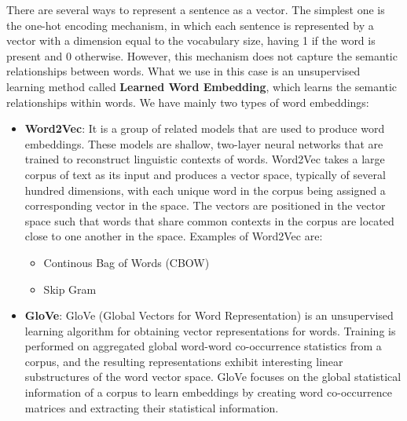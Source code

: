 \documentclass[12pt]{article}
\begin{document}
There are several ways to represent a sentence as a vector. The simplest one is the one-hot encoding mechanism, 
in which each sentence is represented by a vector with a dimension equal to the vocabulary size, having 1 
if the word is present and 0 otherwise. However, this mechanism does not capture the semantic relationships
between words. What we use in this case is an unsupervised learning method called 
\textbf{Learned Word Embedding}, which learns the semantic relationships within words.
We have mainly two types of word embeddings:
\begin{itemize}
    \item \textbf{Word2Vec}: It is a group of related models that are used to produce word embeddings. 
    These models are shallow, two-layer neural networks that are trained to reconstruct linguistic contexts of 
    words. Word2Vec takes a large corpus of text as its input and produces a vector space, typically of several 
    hundred dimensions, with each unique word in the corpus being assigned a corresponding vector in the space. 
    The vectors are positioned in the vector space such that words that share common contexts in the corpus are located close to one another in the space.
    Examples of Word2Vec are:
    \begin{itemize}
        \item Continous Bag of Words (CBOW)
        \item Skip Gram
    \end{itemize}
    \item \textbf{GloVe}: GloVe (Global Vectors for Word Representation) is an unsupervised learning algorithm for 
    obtaining vector representations for words. Training is performed on aggregated global word-word 
    co-occurrence statistics from a corpus, and the resulting representations exhibit interesting linear 
    substructures of the word vector space. GloVe focuses on the global statistical information of a corpus 
    to learn embeddings by creating word co-occurrence matrices and extracting their statistical information.
\end{itemize}
\end{document}

